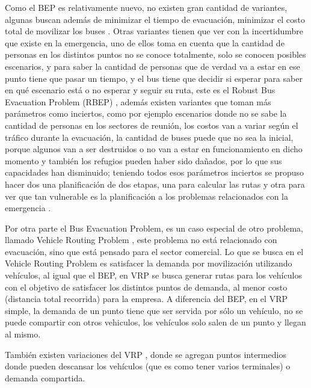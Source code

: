 \documentclass[letter, 10pt]{article}
\begin{document}
Como el BEP es relativamente nuevo, no existen gran cantidad de variantes, algunas buscan además de minimizar el tiempo de evacuación, minimizar el costo total de movilizar los buses \cite{bish2011planning}. Otras variantes tienen que ver con la incertidumbre que existe en la emergencia, uno de ellos toma en cuenta que la cantidad de personas en los distintos puntos no se conoce totalmente, solo se conocen posibles escenarios, y para saber la cantidad de personas que de verdad va a estar en ese punto tiene que pasar un tiempo, y el bus tiene que decidir si esperar para saber en qué escenario está o no esperar y seguir su ruta, este es el Robust Bus Evacuation Problem (RBEP) \cite{goerigk2012robust}, además existen variantes que toman más parámetros como inciertos, como por ejemplo escenarios donde no se sabe la cantidad de personas en los sectores de reunión, los costos van a variar según el tráfico durante la evacuación, la cantidad de buses puede que no sea la inicial, porque algunos van a ser destruidos o no van a estar en funcionamiento en dicho momento y también los refugios pueden haber sido dañados, por lo que sus capacidades han disminuido; teniendo todos esos parámetros inciertos se propuso hacer dos una planificación de dos etapas, una para calcular las rutas y otra para ver que tan vulnerable es la planificación a los problemas relacionados con la emergencia \cite{goerigk2013two}. 


Por otra parte el Bus Evacuation Problem, es un caso especial de otro problema, llamado Vehicle Routing Problem \cite{toth2001vehicle, golden2008vehicle}, este problema no está relacionado con evacuación, sino que está pensado para el sector comercial. Lo que se busca en el Vehicle Routing Problem es satisfacer la demanda por movilización utilizando vehículos, al igual que el BEP, en VRP se busca generar rutas para los vehículos con el objetivo de satisfacer los distintos puntos de demanda, al menor costo (distancia total recorrida) para la empresa. A diferencia del BEP, en el VRP simple, la demanda de un punto tiene que ser servida por sólo un vehículo, no se puede compartir con otros vehiculos, los vehículos solo salen de un punto y llegan al mismo. 

También existen variaciones del VRP \cite{golden2008vehicle , bish2011planning}, donde se agregan puntos intermedios donde pueden descansar los vehículos (que es como tener varios terminales) o demanda compartida. 
\end{document}
